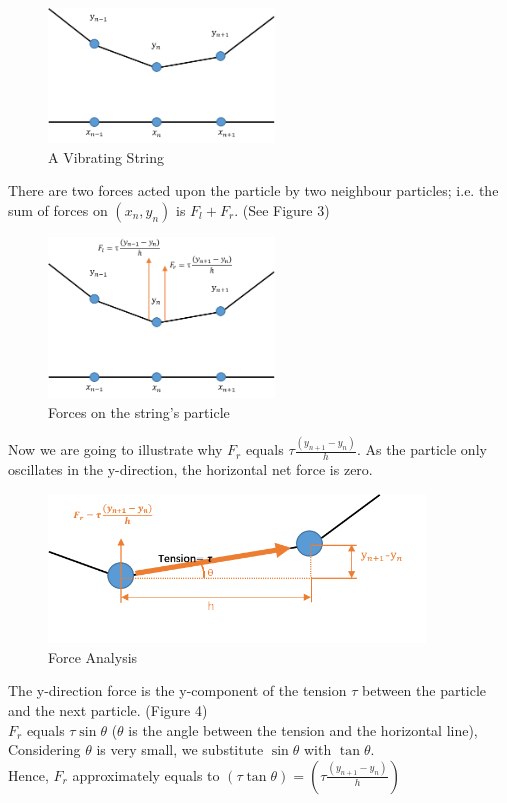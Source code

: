 \documentclass[UTF8,10pt,a4paper]{ctexart}
\begin{document}
		\begin{figure}[ht]
			\centering
			\includegraphics[width=6cm]{vibratingString.png}
			\caption{A Vibrating String}
			\label{fig:vibStr}
		\end{figure}		
  		\noindent  
		There are two forces acted upon the particle by two neighbour particles;
		i.e. the sum of forces on $(x_n,y_n)$ is $F_l+F_r$. (See Figure 3)\\
		\begin{figure}[ht]
			\centering
			\includegraphics[width=6cm]{vibratingStringF.png}
			\caption{Forces on the string's particle}
			\label{fig:vibStrF}
		\end{figure}
		
		\noindent		  
		Now we are going to illustrate why $F_r$ equals  $\tau\frac{(y_{n+1}-y_n)}{h}$. 
		As the particle only oscillates in the y-direction, the horizontal net force is zero.\\		 
		\begin{figure}[h]
			\centering
			\includegraphics[width=10cm]{tension.png}
			\caption{Force Analysis}
			\label{fig:tens}
		\end{figure}	
		
		\noindent
		The y-direction force is the y-component of the tension $\tau$ between the particle and 
		the next particle. (Figure 4)\\
		$F_r$ equals $\tau \sin\theta$ ($\theta$ is the angle between the tension and the horizontal line),
		Considering $\theta$ is very small, we substitute $\sin\theta$ with $\tan\theta$.\\
		Hence, $F_r$ approximately equals to $(\tau \tan\theta)= (\tau\frac{(y_{n+1}-y_n)}{h})$ 
		
\end{document}
